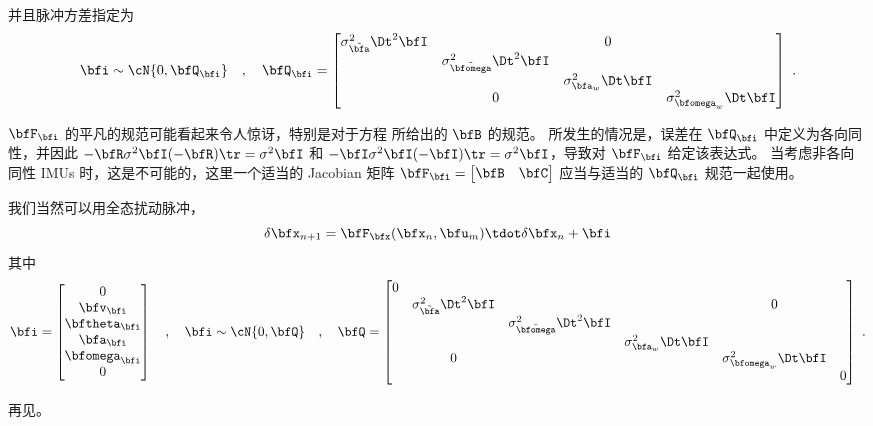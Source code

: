 %
并且脉冲方差指定为
%
\begin{equation}
\bfi \sim \cN\{0,\bfQ_\bfi\}
\quad,\quad
\bfQ_\bfi = \begin{bmatrix}
\sigma_{\tilde\bfa}^2\Dt^2\bfI &&0&\\
& \sigma_{\tilde\bfomega}^2\Dt^2\bfI &&\\
&& \sigma_{\bfa_w}^2\Dt\bfI &\\
&0&& \sigma_{\bfomega_w}^2\Dt\bfI 
\end{bmatrix}~.
\end{equation}



$\bfF_\bfi$ 的平凡的规范可能看起来令人惊讶，特别是对于方程  所给出的 $\bfB$ 的规范。
所发生的情况是，误差在  $\bfQ_\bfi$ 中定义为各向同性，并因此 $-\bfR\sigma^2\bfI(-\bfR)\tr = \sigma^2\bfI$ 和 $-\bfI\sigma^2\bfI(-\bfI)\tr = \sigma^2\bfI$，导致对 $\bfF_\bfi$ 给定该表达式。
当考虑非各向同性 IMUs 时，这是不可能的，这里一个适当的 Jacobian 矩阵 $\bfF_\bfi=\begin{bmatrix}
\bfB & \bfC
\end{bmatrix}$ 应当与适当的 $\bfQ_\bfi$ 规范一起使用。


\bigskip
我们当然可以用全态扰动脉冲，
%
\begin{equation}
\delta\bfx_{n+1} = \bfF_\bfx(\bfx_n, \bfu_m)\tdot \delta\bfx_n+\bfi
\end{equation}
%
其中
%
\begin{equation}
\bfi = \begin{bmatrix}
0 \\
\bfv_\bfi \\
\bftheta_\bfi \\
\bfa_\bfi \\
\bfomega_\bfi \\
0
\end{bmatrix}
\quad,\quad
\bfi \sim \cN\{0,\bfQ\}
\quad,\quad
\bfQ = \begin{bmatrix}
0 & \\
& \sigma_{\tilde\bfa}^2\Dt^2\bfI &&&0&\\
&& \sigma_{\tilde\bfomega}^2\Dt^2\bfI &&\\
&&& \sigma_{\bfa_w}^2\Dt\bfI &\\
&0&&& \sigma_{\bfomega_w}^2\Dt\bfI \\
&&&&&0
\end{bmatrix}~.
\end{equation}



\bigskip
\bigskip
\bigskip

再见。

